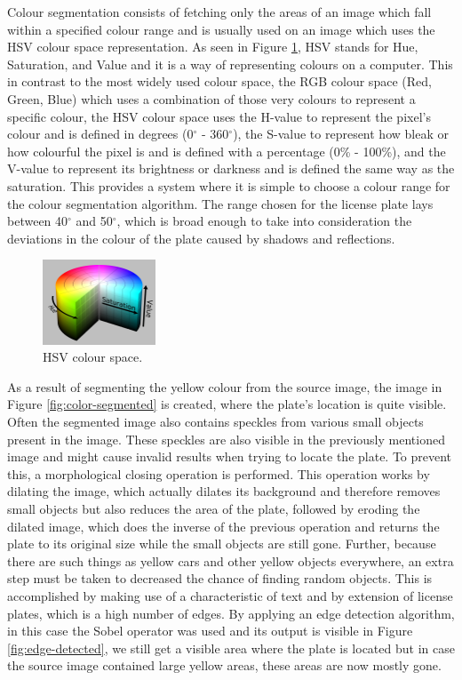 Colour segmentation consists of fetching only the areas of an image which fall within a specified colour range and is usually used on an image which uses the HSV colour space representation. As seen in Figure \ref{fig:hsv}, HSV stands for Hue, Saturation, and Value and it is a way of representing colours on a computer. This in contrast to the most widely used colour space, the RGB colour space (Red, Green, Blue) which uses a combination of those very colours to represent a specific colour, the HSV colour space uses the H-value to represent the pixel's colour and is defined in degrees (0$^{\circ}$ - 360$^{\circ}$), the S-value to represent how bleak or how colourful the pixel is and is defined with a percentage (0\% - 100\%), and the V-value to represent its brightness or darkness and is defined the same way as the saturation. This provides a system where it is simple to choose a colour range for the colour segmentation algorithm. The range chosen for the license plate lays between 40$^{\circ}$ and 50$^{\circ}$, which is broad enough to take into consideration the deviations in the colour of the plate caused by shadows and reflections.

\begin{figure}[h]
    \centering
    \includegraphics[width=0.3\textwidth]{plaatjes/hsv}
    \caption{HSV colour space.}
    \label{fig:hsv}
\end{figure}

As a result of segmenting the yellow colour from the source image, the image in Figure \ref{fig:color-segmented} is created, where the plate's location is quite visible. Often the segmented image also contains speckles from various small objects present in the image. These speckles are also visible in the previously mentioned image and might cause invalid results when trying to locate the plate. To prevent this, a morphological closing operation \cite{morphclose} is performed. This operation works by dilating the image, which actually dilates its background and therefore removes small objects but also reduces the area of the plate, followed by eroding the dilated image, which does the inverse of the previous operation and returns the plate to its original size while the small objects are still gone. Further, because there are such things as yellow cars and other yellow objects everywhere, an extra step must be taken to decreased the chance of finding random objects. This is accomplished by making use of a characteristic of text and by extension of license plates, which is a high number of edges. By applying an edge detection algorithm, in this case the Sobel operator \cite{sobel} was used and its output is visible in Figure \ref{fig:edge-detected}, we still get a visible area where the plate is located but in case the source image contained large yellow areas, these areas are now mostly gone.

